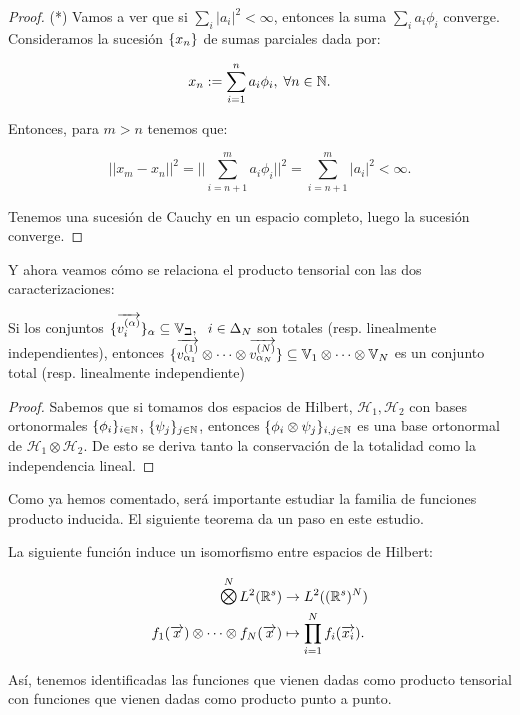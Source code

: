 \begin{proof}
    (*) Vamos a ver que si $\sum_i |a_i|^2 < \infty$, entonces la suma $\sum_i a_i \phi_i$ converge. Consideramos la sucesión $\{ x_n \}$ de sumas parciales dada por:

    \begin{equation}
        x_n := \sum_{i = 1}^n a_i \phi_i, \; \forall n \in \mathbb{N}.
    \end{equation}

    Entonces, para $m > n$ tenemos que:

    \begin{equation}
        ||x_m - x_n||^2 = ||\sum_{i = n+1}^m a_i \phi_i ||^2 = \sum_{i = n+1}^{m} |a_i| ^ 2 < \infty.
    \end{equation}

    Tenemos una sucesión de Cauchy en un espacio completo, luego la sucesión converge.

\end{proof}

Y ahora veamos cómo se relaciona el producto tensorial con las dos caracterizaciones:

\begin{proposicion} \label{prop:conservacion_totalidad_indp_lineal_general}
	Si los conjuntos $\{\overrightarrow{v_i^{(\alpha)}}\}_{\alpha} \subseteq \mathbb{V_i}, \ \  i \in \Delta_{N}$ son totales (resp. linealmente independientes), entonces $\{ \overrightarrow{v^{(1)}_{\alpha_1}} \otimes \cdots \otimes  \overrightarrow{v^{(N)}_{\alpha_N}}  \} \subseteq \mathbb{V}_1 \otimes \cdots \otimes \mathbb{V}_N$ es un conjunto total (resp. linealmente independiente)
\end{proposicion}

\begin{proof}
    Sabemos que si tomamos dos espacios de Hilbert, $\mathcal{H}_1, \mathcal{H}_2$ con bases ortonormales $\{ \phi_i \}_{i \in \mathbb{N}}$, $\{ \psi_j \}_{j \in \mathbb{N}}$, entonces $\{ \phi_i \otimes \psi_j \}_{i, j \in \mathbb{N}}$ es una base ortonormal de $\mathcal{H}_1 \otimes \mathcal{H}_2$. De esto se deriva tanto la conservación de la totalidad como la independencia lineal.
\end{proof}

Como ya hemos comentado, será importante estudiar la familia de funciones producto inducida. El siguiente teorema da un paso en este estudio.

\begin{teorema}
	La siguiente función induce un isomorfismo entre espacios de Hilbert:

	\begin{equation}
		\begin{split}
			\MediumOtimes^{N} L^2(\R^s) &\to L^2((\R^s)^N) \\
			f_1(\nv{x}) \otimes \cdots \otimes f_N(\nv{x}) &\mapsto \prod_{i = 1}^N f_i(\nv{x_i}).
		\end{split}
	\end{equation}

	Así, tenemos identificadas las funciones que vienen dadas como producto tensorial con funciones que vienen dadas como producto punto a punto.
\end{teorema}

